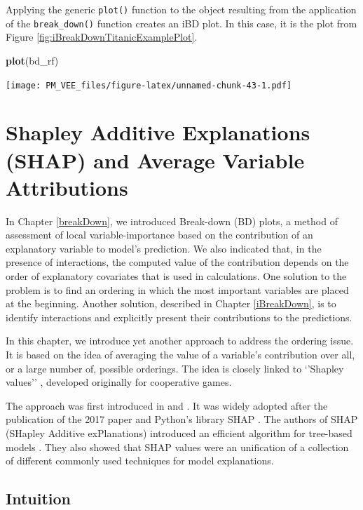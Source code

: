 \documentclass[12pt,]{krantz}
\newenvironment{Shaded}{\begin{snugshade}}{\end{snugshade}}
\newcommand{\KeywordTok}[1]{\textcolor[rgb]{0.13,0.29,0.53}{\textbf{#1}}}
\newcommand{\NormalTok}[1]{#1}
\begin{document}
Applying the generic \texttt{plot()} function to the object resulting from the application of the \texttt{break\_down()} function creates an iBD plot. In this case, it is the plot from Figure \ref{fig:iBreakDownTitanicExamplePlot}.

\begin{Shaded}
\begin{Highlighting}[]
\KeywordTok{plot}\NormalTok{(bd_rf) }
\end{Highlighting}
\end{Shaded}

\texttt{[image: PM\_VEE\_files/figure-latex/unnamed-chunk-43-1.pdf]}

\hypertarget{shapley}{%
\section{Shapley Additive Explanations (SHAP) and Average Variable Attributions}\label{shapley}}

In Chapter \ref{breakDown}, we introduced Break-down (BD) plots, a method of assessment of local variable-importance based on the contribution of an explanatory variable to model's prediction. We also indicated that, in the presence of interactions, the computed value of the contribution depends on the order of explanatory covariates that is used in calculations. One solution to the problem is to find an ordering in which the most important variables are placed at the beginning. Another solution, described in Chapter \ref{iBreakDown}, is to identify interactions and explicitly present their contributions to the predictions.

In this chapter, we introduce yet another approach to address the ordering issue. It is based on the idea of averaging the value of a variable's contribution over all, or a large number of, possible orderings. The idea is closely linked to `'Shapley values'' \citep{shapleybook1952}, developed originally for cooperative games.

The approach was first introduced in \citep{imeJLMR} and \citep{Strumbelj2014}. It was widely adopted after the publication of the 2017 paper \citep{SHAP} and Python's library SHAP \citep{shapPackage}. The authors of SHAP (SHapley Additive exPlanations) introduced an efficient algorithm for tree-based models \citep{TreeSHAP}. They also showed that SHAP values were an unification of a collection of different commonly used techniques for model explanations.

\hypertarget{SHAPIntuition}{%
\subsection{Intuition}\label{SHAPIntuition}}
\end{document}

